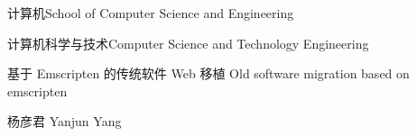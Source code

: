 
\school
{计算机}{School of Computer Science and Engineering}

\major
{计算机科学与技术}{Computer Science and Technology Engineering}

\thesistitle
{基于 Emscripten 的传统软件 Web 移植}
{}
{Old software migration based on emscripten}
{}


\thesisauthor 杨彦君 Yanjun Yang
{}{}

\teacher
{}{}






